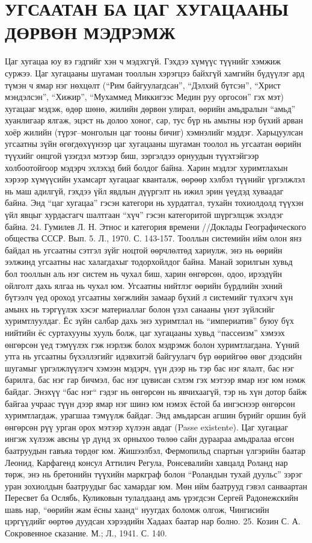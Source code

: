 \section{УГСААТАН БА ЦАГ ХУГАЦААНЫ ДӨРВӨН МЭДРЭМЖ}
Цаг хугацаа юу вэ гэдгийг хэн ч мэдэхгүй. Гэхдээ хүмүүс түүнийг хэмжиж суржээ. Цаг хугацааны шугаман тооллын хэрэгцээ байхгүй хамгийн бүдүүлэг ард түмэн ч ямар нэг нөхцөлт (“Рим байгуулагдсан”, “Дэлхий бүтсэн”, “Христ мэндэлсэн”, “Хижир”, “Мухаммед Миккигээс Медин руу оргосон” гэх мэт) хугацааг мэдэж, өдөр шөнө, жилийн дөрвөн улирал, өөрийн амьдралын “амьд” хуанлигаар ялгаж, эцэст нь долоо хоног, сар, тус бүр нь амьтны нэр бүхий арван хоёр жилийн (түрэг–монголын цаг тооны бичиг) хэмнэлийг мэддэг. Харьцуулсан угсаатны зүйн өгөгдөхүүнээр цаг хугацааны шугаман тоолол нь угсаатан өөрийн түүхийг онцгой үзэгдэл мэтээр биш, зэргэлдээ орнуудын түүхтэйгээр холбоотойгоор мэдэрч эхлэхэд бий болдог байна. Харин мэдлэг хуримтлахын хэрээр хүмүүсийн ухамсарт хугацааг кванталж, өөрөөр хэлбэл түүнийг үргэлжлэл нь маш адилгүй, гэхдээ үйл явдлын дүүргэлт нь ижил эрин үеүдэд хуваадаг байна. Энд “цаг хугацаа” гэсэн категори нь хурдатгал, тухайн тохиолдолд түүхэн үйл явцыг хурдасгагч шалтгаан “хүч” гэсэн категоритой шүргэлцэж эхэлдэг байна. 24. Гумилев Л. Н. Этнос и категория времени //Доклады Географического общества СССР. Вып. 5. Л., 1970. С. 143-157.
Тооллын системийн ийм олон янз байдал нь угсаатны сэтгэл зүйг ноцтой өөрчлөлтөд хариулж, энэ нь өөрийн ээлжинд угсаатны нас халагдахыг тодорхойлдог байна. Манай зорилгын хувьд бол тооллын аль нэг систем нь чухал биш, харин өнгөрсөн, одоо, ирээдүйн ойлголт дахь ялгаа нь чухал юм.
Угсаатны нийтлэг өөрийн бүрдлийн эхний бүтээлч үед ороход угсаатны хөгжлийн замаар бүхий л системийг түлхэгч хүн амынх нь тэргүүлэх хэсэг материаллаг болон үзэл санааны үнэт зүйлсийг хуримтлуулдаг. Ёс зүйн салбар дахь энэ хуримтлал нь “империатив” буюу бүх нийтийн ёс суртахууны хууль болж, цаг хугацааны хувьд “пассеизм” хэмээх өнгөрсөн үед тэмүүлэх гэж нэрлэж болох мэдрэмж болон хуримтлагдана. Үүний утга нь угсаатны бүхэллэгийг идэвхитэй байгуулагч бүр өөрийгөө өвөг дээдсийн шугамыг үргэлжлүүлэгч хэмээн мэдэрч, үүн дээр нь тэр бас нэг ялалт, бас нэг барилга, бас нэг гар бичмэл, бас нэг цувисан сэлэм гэх мэтээр ямар нэг юм нэмж байдаг. Энэхүү “бас нэг“ гэдэг нь өнгөрсөн нь явчихаагүй, тэр нь хүн дотор байж байгаа учраас түүн дээр ямар нэг шинэ юм нэмэх ёстой ба ингэснээр өнгөрсөн хуримтлагдаж, урагшаа тэмүүлж байдаг. Энд амьдарсан агшин бүрийг оршин буй өнгөрсөн рүү урган орох мэтээр хүлээн авдаг (Passe existente).
Цаг хугацааг ингэж хүлээж авсны үр дүнд эх орныхоо төлөө сайн дураараа амьдралаа өгсөн баатруудын гавъяа төрдөг юм. Жишээлбэл, Фермопильд спартын үлгэрийн баатар Леонид, Карфагенд консул Аттилич Регула, Ронсевалийн хавцалд Роланд нар төрж, энэ нь бретонийн түүхийн маркграф болон “Роландын тухай дуульс” зэрэг уран зохиолдын баатруудыг бас хамардаг юм. Мөн ийм баатрууд гэвэл санваартан Пересвет ба Ослябь, Куликовын тулалдаанд амь үрэгдсэн Сергей Радонежскийн шавь нар, “өөрийн жам ёсны хаанд“ нуугдах боломж олгож, Чингисийн цэргүүдийг өөртөө дуудсан хэрээдийн Хадаах баатар нар болно. 25. Козин С. А. Сокровенное сказание. М.; Л., 1941. С. 140.
